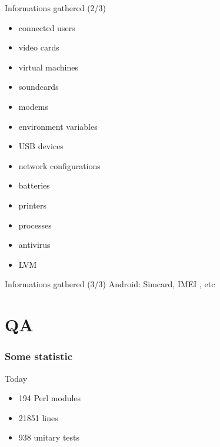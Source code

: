 \documentclass{beamer}
\begin{document}
\begin{frame}
    \begin{block}{Informations gathered (2/3)}
        \begin{itemize}
        \item connected users
        \item video cards
        \item virtual machines
        \item soundcards
        \item modems
        \item environment variables
        \item USB devices
        \item network configurations
        \item batteries
        \item printers
        \item processes
        \item antivirus
        \item LVM
        \end{itemize}
    \end{block}
\end{frame}

\begin{frame}
    \begin{block}{Informations gathered (3/3)}
        Android: Simcard, IMEI , etc
    \end{block}
\end{frame}

\section{QA}

\begin{frame}
    \frametitle{Some statistic}

    \begin{block}{Today}
        \begin{itemize}
            \item 194 Perl modules
            \item 21851 lines
            \item 938 unitary tests
        \end{itemize}
    \end{block}

\end{frame}
\end{document}
